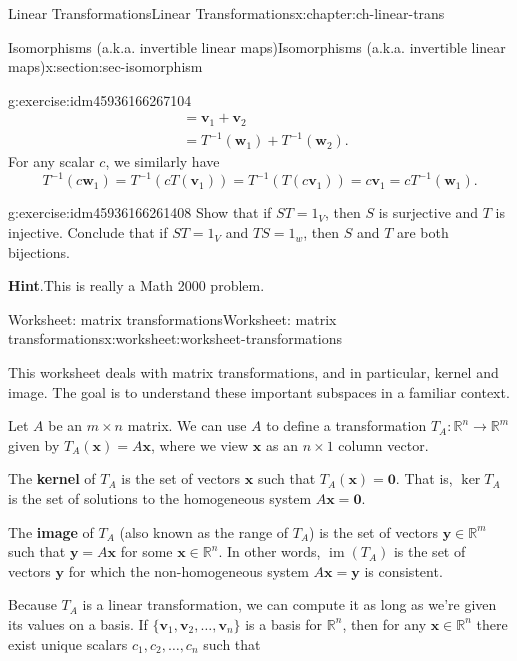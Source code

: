 \documentclass[oneside,10pt,]{book}
\newcommand{\blocktitlefont}{\relax}
\newcommand{\terminology}[1]{\textbf{#1}}
\numberwithin{equation}{section}
\newcommand{\R}{\mathbb{R}}
\newcommand{\im}{\operatorname{im}}
\newcommand{\vv}{\mathbf{v}}
\newcommand{\ww}{\mathbf{w}}
\newcommand{\xx}{\mathbf{x}}
\newcommand{\yy}{\mathbf{y}}
\newcommand{\zer}{\mathbf{0}}
\newcommand{\amp}{&}
\begin{document}
\begin{chapterptx}{Linear Transformations}{}{Linear Transformations}{}{}{x:chapter:ch-linear-trans}
\begin{sectionptx}{Isomorphisms (a.k.a. invertible linear maps)}{}{Isomorphisms (a.k.a. invertible linear maps)}{}{}{x:section:sec-isomorphism}
\begin{inlineexercise}{}{g:exercise:idm45936166267104}
\begin{align*}
\amp = \vv_1+\vv_2\\
\amp = T^{-1}(\ww_1)+T^{-1}(\ww_2)\text{.}
\end{align*}
For any scalar \(c\), we similarly have%
\begin{equation*}
T^{-1}(c\ww_1) = T^{-1}(cT(\vv_1))=T^{-1}(T(c\vv_1)) = c\vv_1 = cT^{-1}(\ww_1)\text{.}
\end{equation*}
%
\end{inlineexercise}%
\begin{inlineexercise}{}{g:exercise:idm45936166261408}%
Show that if \(ST=1_V\), then \(S\) is surjective and \(T\) is injective. Conclude that if \(ST=1_V\) and \(TS=1_w\), then \(S\) and \(T\) are both bijections.%
\par\smallskip%
\noindent\textbf{\blocktitlefont Hint}.\label{g:hint:idm45936166256912}{}\hypertarget{g:hint:idm45936166256912}{}\quad{}This is really a Math 2000 problem.%
\end{inlineexercise}%
\end{sectionptx}
%
%
\typeout{************************************************}
\typeout{************************************************}
%
\begin{worksheet-section}{Worksheet: matrix transformations}{}{Worksheet: matrix transformations}{}{}{x:worksheet:worksheet-transformations}
\begin{introduction}{}%
This worksheet deals with matrix transformations, and in particular, kernel and image. The goal is to understand these important subspaces in a familiar context.%
\par
Let \(A\) be an \(m\times n\) matrix. We can use \(A\) to define a transformation \(T_A:\R^n\to \R^m\) given by \(T_A(\xx)=A\xx\), where we view \(\xx\) as an \(n\times 1\) column vector.%
\par
The \terminology{kernel} of \(T_A\) is the set of vectors \(\xx\) such that \(T_A(\xx)=\zer\). That is, \(\ker T_A\) is the set of solutions to the homogeneous system \(A\xx = \zer\).%
\par
The \terminology{image} of \(T_A\) (also known as the range of \(T_A\)) is the set of vectors \(\yy\in \R^m\) such that \(\yy = A\xx\) for some \(\xx\in\R^n\). In other words, \(\im(T_A)\) is the set of vectors \(\yy\) for which the non-homogeneous system \(A\xx=\yy\) is consistent.%
\par
Because \(T_A\) is a linear transformation, we can compute it as long as we're given its values on a basis. If \(\{\vv_1, \vv_2,\ldots, \vv_n\}\) is a basis for \(\R^n\), then for any \(\xx\in\R^n\) there exist unique scalars \(c_1,c_2,\ldots, c_n\) such that%

\end{introduction}
\end{worksheet-section}
\end{chapterptx}
\end{document}
